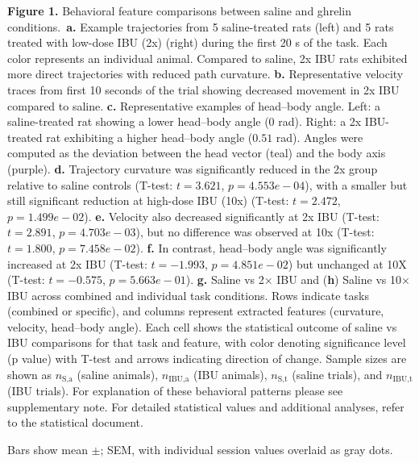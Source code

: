 \textbf{Figure 1.} Behavioral feature comparisons between saline and ghrelin conditions.\
\textbf{a.} Example trajectories from 5 saline-treated rats (left) and 5 rats treated with low-dose IBU (2x) (right) during the first 20 s of the task. Each color represents an individual animal. Compared to saline, 2x IBU rats exhibited more direct trajectories with reduced path curvature.
\textbf{b.} Representative velocity traces from first 10 seconds of the trial showing decreased movement in 2x IBU compared to saline.
\textbf{c.} Representative examples of head–body angle. Left: a saline-treated rat showing a lower head–body angle ($0$ rad). Right: a 2x IBU-treated rat exhibiting a higher head–body angle ($0.51$ rad). Angles were computed as the deviation between the head vector (teal) and the body axis (purple).
\textbf{d.} Trajectory curvature was significantly reduced in the 2x group relative to saline controls (T-test: $t=3.621$, $p=4.553e-04$), with a smaller but still significant reduction at high-dose IBU (10x) (T-test: $t=2.472$, $p=1.499e-02$).
\textbf{e.} Velocity also decreased significantly at 2x IBU (T-test: $t=2.891$, $p=4.703e-03$), but no difference was observed at 10x (T-test: $t=1.800$, $p=7.458e-02$).
\textbf{f.} In contrast, head–body angle was significantly increased at 2x IBU (T-test: $t=-1.993$, $p=4.851e-02$) but unchanged at 10X (T-test: $t=-0.575$, $p=5.663e-01$).
\textbf{g.} Saline vs 2× IBU and (\textbf{h}) Saline vs 10× IBU across combined and individual task conditions. Rows indicate tasks (combined or specific), and columns represent extracted features (curvature, velocity, head–body angle). Each cell shows the statistical outcome of saline vs IBU comparisons for that task and feature, with color denoting significance level (p value) with T-test and arrows indicating direction of change. Sample sizes are shown as $n_{\text{S,a}}$ (saline animals), $n_{\text{IBU,a}}$ (IBU animals), $n_{\text{S,t}}$ (saline trials), and $n_{\text{IBU,t}}$ (IBU trials).
For explanation of these behavioral patterns please see supplementary note.
For detailed statistical values and additional analyses, refer to the statistical document.

Bars show mean $\pm$; SEM, with individual session values overlaid as gray dots.


